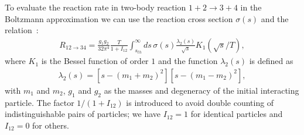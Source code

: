 To evaluate the reaction rate in two-body reaction $1+2\rightarrow3+4$ in the Boltzmann approximation we can use the reaction cross section $\sigma(s)$ and the relation~\cite{Letessier:2002ony}:
\begin{align}
R_{12\rightarrow34}=\frac{g_1g_2}{32\pi^4}\frac{T}{1+I_{12}}\!\!\int^\infty_{s_{th}}\!\!\!\!ds\,\sigma(s)\frac{\lambda_2(s)}{\sqrt{s}}\!K_1\!\!\left({\sqrt{s}}/{T}\right),
\end{align}
where $K_1$ is the Bessel function of order $1$ and the function $\lambda_2(s)$ is defined as
\begin{align}
\lambda_2(s)=\left[s-(m_1+m_2)^2\right]\left[s-(m_1-m_2)^2\right],
\end{align}
with $m_1$ and $m_2$, $g_1$ and $g_2$ as the masses and degeneracy of the initial interacting particle. The factor $1/(1+I_{12})$ is introduced to avoid double counting of indistinguishable pairs of particles; we have $I_{12}=1$ for identical particles and $I_{12}=0$ for others. 


